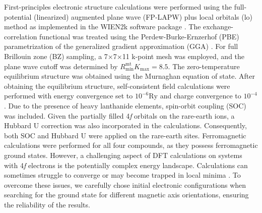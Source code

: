 \documentclass[preprint,12pt]{elsarticle}
\begin{document}
First-principles electronic structure calculations were performed using the full-potential (linearized) augmented plane wave (FP-LAPW) plus local orbitals (lo) method as implemented in the WIEN2k software package \cite{wien2k,PRB64-195134_2001}.%
The exchange-correlation functional was treated using the Perdew-Burke-Ernzerhof (PBE) parametrization of the generalized gradient approximation (GGA) \cite{PhysRevLett.77.3865}.%
For full Brillouin zone (BZ) sampling, a 7×7×11 k-point mesh \cite{Brando2016_RMP88-025006}%
was employed, and the plane wave cutoff was determined by $R_{\mathrm{min}}^{\mathrm{mt}} K_{\mathrm{max}}=8.5$. The zero-temperature equilibrium structure was obtained using the Murnaghan equation of state. After obtaining the equilibrium structure, self-consistent field calculations were performed with energy convergence set to $10^{-6} \mathrm{Ry}$ and charge convergence to $10^{-4}$. Due to the presence of heavy lanthanide elements, spin-orbit coupling (SOC) was included. Given the partially filled 4\textit{f} orbitals on the rare-earth ions, a Hubbard U correction was also incorporated in the calculations. Consequently, both SOC and Hubbard U were applied on the rare-earth sites. Ferromagnetic calculations were performed for all four compounds, as they possess ferromagnetic ground states. However, a challenging aspect of DFT calculations on systems with 4\textit{f} electrons is the potentially complex energy landscape. Calculations can sometimes struggle to converge or may become trapped in local minima \cite{dorado2013advances}.%
To overcome these issues, we carefully chose initial electronic configurations when searching for the ground state for different magnetic axis orientations, ensuring the reliability of the results.

\end{document}

